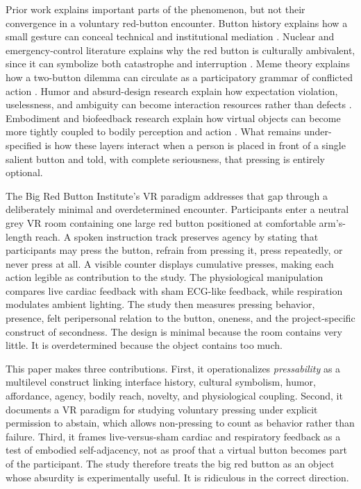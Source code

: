 Prior work explains important parts of the phenomenon, but not their convergence in a voluntary red-button encounter. Button history explains how a small gesture can conceal technical and institutional mediation \citep{Plotnick2018}. Nuclear and emergency-control literature explains why the red button is culturally ambivalent, since it can symbolize both catastrophe and interruption \citep{PlotnickWarfare2012,Kwon1996EmergencyStop}. Meme theory explains how a two-button dilemma can circulate as a participatory grammar of conflicted action \citep{Shifman2013Memes,Milner2016WorldMadeMeme}. Humor and absurd-design research explain how expectation violation, uselessness, and ambiguity can become interaction resources rather than defects \citep{Minsky1980Jokes,LepriEtAl2020UselessWorthless}. Embodiment and biofeedback research explain how virtual objects can become more tightly coupled to bodily perception and action \citep{KilteniEtAl2012,LueddeckeFelnhofer2022}. What remains under-specified is how these layers interact when a person is placed in front of a single salient button and told, with complete seriousness, that pressing is entirely optional.

The Big Red Button Institute's VR paradigm addresses that gap through a deliberately minimal and overdetermined encounter. Participants enter a neutral grey VR room containing one large red button positioned at comfortable arm's-length reach. A spoken instruction track preserves agency by stating that participants may press the button, refrain from pressing it, press repeatedly, or never press at all. A visible counter displays cumulative presses, making each action legible as contribution to the study. The physiological manipulation compares live cardiac feedback with sham ECG-like feedback, while respiration modulates ambient lighting. The study then measures pressing behavior, presence, felt peripersonal relation to the button, oneness, and the project-specific construct of secondness. The design is minimal because the room contains very little. It is overdetermined because the object contains too much.

This paper makes three contributions. First, it operationalizes \emph{pressability} as a multilevel construct linking interface history, cultural symbolism, humor, affordance, agency, bodily reach, novelty, and physiological coupling. Second, it documents a VR paradigm for studying voluntary pressing under explicit permission to abstain, which allows non-pressing to count as behavior rather than failure. Third, it frames live-versus-sham cardiac and respiratory feedback as a test of embodied self-adjacency, not as proof that a virtual button becomes part of the participant. The study therefore treats the big red button as an object whose absurdity is experimentally useful. It is ridiculous in the correct direction.

